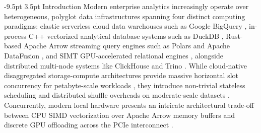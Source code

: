 \documentclass[10pt,a4paper]{article}
\makeatletter
\renewcommand\section{\@startsection{section}{1}{\z@}%
  {-9.5pt \@plus -2pt \@minus -1.5pt}%
  {3.5pt \@plus 1pt}%
  {\normalfont\large\bfseries}}
\makeatother
\begin{document}
\section{Introduction}
Modern enterprise analytics increasingly operate over heterogeneous, polyglot data infrastructures spanning four distinct computing paradigms: elastic serverless cloud data warehouses such as Google BigQuery \cite{melnik2010dremel, melnik2020dremel, lounissi2025funda}, in-process C++ vectorized analytical database systems such as DuckDB \cite{raasveldt2019duckdb, kuiper2024duckdb_ooc}, Rust-based Apache Arrow streaming query engines such as Polars and Apache DataFusion \cite{lamb2024datafusion}, and SIMT GPU-accelerated relational engines \cite{chrysogelos2019hetexchange, shanbhag2020crystal, bress2013hype}, alongside distributed multi-node systems like ClickHouse \cite{schulze2024clickhouse} and Trino \cite{sethi2019presto}. While cloud-native disaggregated storage-compute architectures provide massive horizontal slot concurrency for petabyte-scale workloads \cite{shojaee2024serverless, abdalla2022bigdata}, they introduce non-trivial stateless scheduling and distributed shuffle overheads on moderate-scale datasets \cite{begoli2018calcite, garcia2008database, lounissi2025funda}. Concurrently, modern local hardware presents an intricate architectural trade-off between CPU SIMD vectorization over Apache Arrow memory buffers and discrete GPU offloading across the PCIe interconnect \cite{milicevic2024dlquery, root2019mapd, kim2022blazingsql}.
\end{document}
